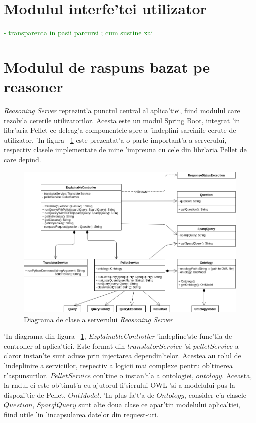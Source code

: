\documentclass[12pt,a4paper,twoside]{report}
\begin{document}
\section{Modulul interfe'tei utilizator}
\textcolor{green}{- transparenta in pasii parcursi ; 
cum sustine xai}

\section{Modulul de raspuns bazat pe reasoner}

{\it Reasoning Server} reprezint'a punctul central al aplica'tiei, fiind modulul care rezolv'a cererile utilizatorilor. Acesta este un modul Spring Boot, integrat 'in libr'aria Pellet ce deleag'a componentele spre a 'indeplini sarcinile cerute de utilizator. 'In figura ~\ref{fig:uml_server} este prezentat'a o parte important'a a serverului, respectiv clasele implementate de mine 'impreuna cu cele din libr'aria Pellet de care depind.
\begin{figure}[h!]
    \centering
    \includegraphics[width = 0.75\linewidth]{img/uml_server.png}
        \caption{Diagrama de clase a serverului {\it Reasoning Server}}
    \label{fig:uml_server}
\end{figure}

'In diagrama din figura ~\ref{fig:uml_server}, {\it ExplainableController} 'indepline'ste func'tia de controller al aplica'tiei. Este format din $translatorService$ 'si $pelletService$ a c'aror instan'te sunt aduse prin injectarea dependin'telor. Acestea au rolul de 'indeplinire a serviciilor, respectiv a logicii mai complexe pentru ob'tinerea r'aspunsurilor. $PelletService$ con'tine o instan't'a a ontologiei, $ontology$. Aceasta, la r\ia ndul ei este ob'tinut'a cu ajutorul fi'sierului OWL 'si a modelului pus la dispozi'tie de Pellet, $OntModel$. 'In plus fa't'a de $Ontology$, consider c'a clasele $Question$, $SparqlQuery$ sunt alte doua clase ce apar'tin modelului aplica'tiei, fiind utile 'in 'incapsularea datelor din request-uri.
\end{document}
